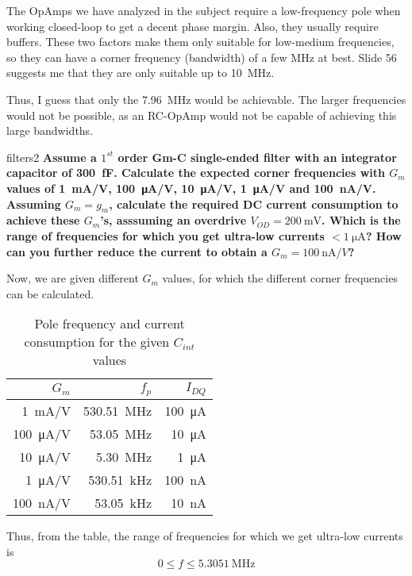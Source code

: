 The OpAmps we have analyzed in the subject require a low-frequency pole when working closed-loop to get a decent phase margin. Also, they usually require buffers. These two factors make them only suitable for low-medium frequencies, so they can have a corner frequency (bandwidth) of a few MHz at best. Slide 56 suggests me that they are only suitable up to \SI{10}{MHz}.

Thus, I guess that only the \SI{7.96}{\MHz} would be achievable. The larger frequencies would not be possible, as an RC-OpAmp would not be capable of achieving this large bandwidths.


\begin{pexbox}{filters2}
	\bfseries
Assume a $1^{st}$ order Gm-C single-ended filter with an integrator capacitor of \SI{300}{\fF}. Calculate the expected corner frequencies with $G_m$ values of \SI{1}{\mA/\V}, \SI{100}{\uA/\V}, \SI{10}{\uA/\V}, \SI{1}{\uA/\V} and \SI{100}{\nA/\V}. Assuming $G_m = g_m$, calculate the required DC current consumption to achieve these $G_m$'s, asssuming an overdrive $V_{OD} = \SI{200}{\mV}$. Which is the range of frequencies for which you get ultra-low currents $< \SI{1}{\uA}$? How can you further reduce the current to obtain a $G_m = \SI{100}{\nA/V}$?
\end{pexbox}


Now, we are given different $G_m$ values, for which the different corner frequencies can be calculated.
\begin{table}[H] \centering
   \begin{tabular}{ |r|r|r| } \hline
	   $G_m$ & $f_p$ & $I_{DQ}$  \\ \hline \hline
	   \SI{1}{\mA/\V} & \SI{530.51}{\MHz} & \SI{100}{\uA} \\ \hline
	   \SI{100}{\uA/\V} & \SI{53.05}{\MHz} & \SI{10}{\uA} \\ \hline
	   \SI{10}{\uA/\V} & \SI{5.30}{\MHz} & \SI{1}{\uA} \\ \hline
	   \SI{1}{\uA/\V} & \SI{530.51}{\kHz} & \SI{100}{\nA} \\ \hline
	   \SI{100}{\nA/\V} & \SI{53.05}{\kHz} & \SI{10}{\nA} \\ \hline
   \end{tabular}
   \caption{Pole frequency and current consumption for the given $C_{int}$ values}
\end{table}

Thus, from the table, the range of frequencies for which we get ultra-low currents is 
\begin{equation}
	\boxed{
		0 \leq f \leq \SI{5.3051}{\MHz}
	}
\end{equation}

